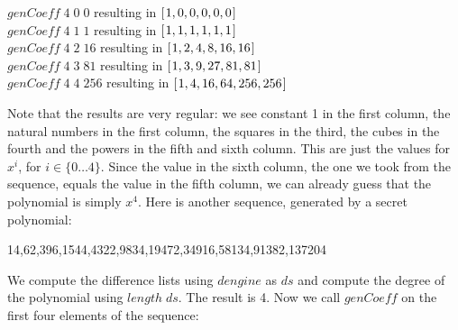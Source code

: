 \documentclass[tikz]{scrreprt}
\newcommand{\Varid}[1]{\mathit{#1}}
\begin{document}
\begin{minipage}{\textwidth}
\ensuremath{\Varid{genCoeff}\;\mathrm{4}\;\mathrm{0}\;\mathrm{0}} resulting in \ensuremath{[\mskip1.5mu \mathrm{1},\mathrm{0},\mathrm{0},\mathrm{0},\mathrm{0},\mathrm{0}\mskip1.5mu]}\\
\ensuremath{\Varid{genCoeff}\;\mathrm{4}\;\mathrm{1}\;\mathrm{1}} resulting in \ensuremath{[\mskip1.5mu \mathrm{1},\mathrm{1},\mathrm{1},\mathrm{1},\mathrm{1},\mathrm{1}\mskip1.5mu]}\\
\ensuremath{\Varid{genCoeff}\;\mathrm{4}\;\mathrm{2}\;\mathrm{16}} resulting in \ensuremath{[\mskip1.5mu \mathrm{1},\mathrm{2},\mathrm{4},\mathrm{8},\mathrm{16},\mathrm{16}\mskip1.5mu]}\\
\ensuremath{\Varid{genCoeff}\;\mathrm{4}\;\mathrm{3}\;\mathrm{81}} resulting in \ensuremath{[\mskip1.5mu \mathrm{1},\mathrm{3},\mathrm{9},\mathrm{27},\mathrm{81},\mathrm{81}\mskip1.5mu]}\\
\ensuremath{\Varid{genCoeff}\;\mathrm{4}\;\mathrm{4}\;\mathrm{256}} resulting in \ensuremath{[\mskip1.5mu \mathrm{1},\mathrm{4},\mathrm{16},\mathrm{64},\mathrm{256},\mathrm{256}\mskip1.5mu]}
\end{minipage}

Note that the results are very regular:
we see constant 1 in the first column,
the natural numbers in the first column,
the squares in the third, the cubes in the fourth and
the powers in the fifth and sixth column.
This are just the values for $x^i$, 
for $i \in \lbrace 0\dots 4\rbrace$.
Since the value in the sixth column, the one we took
from the sequence, equals the value in the fifth column,
we can already guess that the polynomial is simply $x^4$.
Here is another sequence, generated by a secret polynomial:

14,62,396,1544,4322,9834,19472,34916,58134,91382,137204

We compute the difference lists using 
\ensuremath{\Varid{dengine}} as \ensuremath{\Varid{ds}} and compute the degree of the polynomial
using \ensuremath{\Varid{length}\;\Varid{ds}}. The result is 4.
Now we call \ensuremath{\Varid{genCoeff}} on the first four elements of the sequence:
\end{document}
